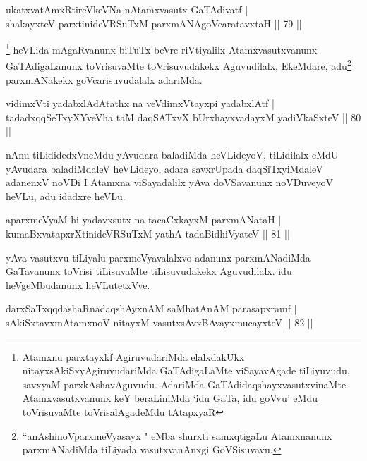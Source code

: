 \begin{shl}
ukatxvatAmxRtireVkeVNa nA\s \s tamxvasutx GaTAdivatf |\\
shakayxteV parxtinideVRSuTxM parxmANAgoVcaratavxtaH \hfill || 79 ||
\end{shl}

\begin{artha}
\footnote{Atamxnu parxtayxkf AgiruvudariMda elalxdakUkx nitayxsAkiSxyAgiruvudariMda GaTAdigaLaMte viSayavAgade tiLiyuvudu, savxyaM parxkAshavAguvudu. AdariMda GaTAdidaqshayxvasutxvinaMte Atamxvasutxvanunx keY beraLiniMda `idu GaTa, idu goVvu' eMdu toVrisuvaMte toVrisalAgadeMdu tAtapxyaR} heVLida mAgaRvanunx biTuTx beVre riVtiyalilx Atamxvasutxvanunx GaTAdigaLanunx toVrisuvaMte toVrisuvudakekx Aguvudilalx, EkeMdare, adu\footnote{``anAshinoV\s parxmeVyasayx " eMba shurxti samxqtigaLu Atamxnanunx parxmANadiMda tiLiyada vasutxvanAnxgi GoVSisuvavu.} parxmANakekx goVcarisuvudalalx adariMda.
\end{artha}

\begin{shl}
vidimxVti yadabxlAdAtathx na veVdimxVtayxpi yadabxlAtf |\\
tadadxqqSeTxyXYveVha taM daqSATxvX bUrxhayxvadayxM yadiVkaSxteV \hfill || 80 ||
\end{shl}

\begin{artha}
nAnu tiLididedxVneMdu yAvudara baladiMda heVLideyoV, tiLidilalx eMdU yAvudara baladiMdaleV heVLideyo, adara savxrUpada daqSiTxyiMdaleV adanenxV noVDi I Atamxna viSayadalilx yAva doVSavanunx noVDuveyoV heVLu, adu idadxre heVLu.
\end{artha}%


\begin{shl}
aparxmeVyaM hi yadavxsutx na tacaCxkayxM parxmANataH |\\
kumaBxvatapxrXtinideVRSuTxM yathA tadaBidhiVyateV \hfill || 81 ||
\end{shl}

\begin{artha}
yAva vasutxvu tiLiyalu parxmeVyavalalxvo adanunx parxmANadiMda GaTavanunx toVrisi tiLisuvaMte tiLisuvudakekx Aguvudilalx. idu heVgeMbudanunx heVLutetxVve.
\end{artha}


\begin{shl}
darxSaTxqqdashaRnadaqshAyxnAM saMhatAnAM parasapxramf |\\
sAkiSxtavxmAtamxnoV nitayxM vasutxsAvxBAvayxmucayxteV \hfill || 82 ||
\end{shl}

